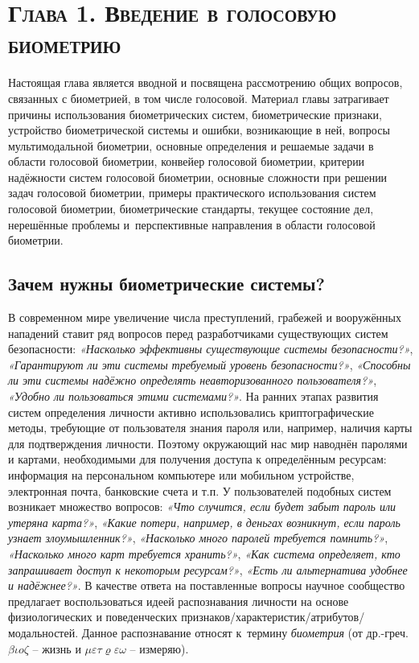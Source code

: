 \documentclass[12pt]{book}
\newcommand\myemptypage{
    \null
    \addtocounter{page}{-1}
    \newpage
    }
\begin{document}

\chapter*{\textsc{Глава 1. Введение в голосовую биометрию}}

\thispagestyle{fancy}

\large{Настоящая глава является вводной и посвящена рассмотрению общих вопросов, связанных с биометрией, в том числе голосовой. Материал главы затрагивает причины использования биометрических систем, биометрические признаки, устройство биометрической системы и ошибки, возникающие в ней, вопросы мультимодальной биометрии, основные определения и решаемые задачи в области голосовой биометрии, конвейер голосовой биометрии, критерии надёжности систем голосовой биометрии, основные сложности при решении задач голосовой биометрии, примеры практического использования систем голосовой биометрии, биометрические стандарты, текущее состояние дел, нерешённые проблемы и~перспективные направления в области голосовой биометрии.}

\section{Зачем нужны биометрические системы?}

\large{В современном мире увеличение числа преступлений, грабежей и вооружённых нападений ставит ряд вопросов перед разработчиками существующих систем безопасности: \textit{«Насколько эффективны существующие системы безопасности?»}, \textit{«Гарантируют ли эти системы требуемый уровень безопасности?»}, \textit{«Способны ли эти системы надёжно определять неавторизованного пользователя?»}, \textit{«Удобно ли пользоваться этими системами?»}. На ранних этапах развития систем определения личности активно использовались криптографические методы, требующие от пользователя знания пароля или, например, наличия карты для подтверждения личности. Поэтому окружающий нас мир наводнён паролями и картами, необходимыми для получения доступа к определённым ресурсам: информация на персональном компьютере или мобильном устройстве, электронная почта, банковские счета и т.п. У пользователей подобных систем возникает множество вопросов:  \textit{«Что случится, если будет забыт пароль или утеряна карта?»}, \textit{«Какие потери, например, в деньгах возникнут, если пароль узнает злоумышленник?»}, \textit{«Насколько много паролей требуется помнить?»}, \textit{«Насколько много карт требуется хранить?»}, \textit{«Как система определяет, кто запрашивает доступ к некоторым ресурсам?»}, \textit{«Есть ли альтернатива удобнее и надёжнее?»}. В качестве ответа на поставленные вопросы научное сообщество предлагает воспользоваться идеей распознавания личности на основе физиологических и поведенческих признаков/характеристик/атрибутов/модальностей. Данное распознавание относят к~термину \textit{биометрия} (от др.-греч. $\beta \iota o \zeta$ -- жизнь и $\mu \varepsilon \tau \varrho \varepsilon \omega$ -- измеряю).}
\end{document}
